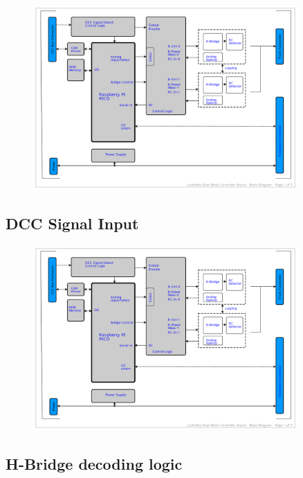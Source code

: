 \begin{figure}[htbp]
    \centering
    \includegraphics[page=2, width=0.9\textwidth]{./Schematics/Schematic_LcsNodes-Dual-Block-Controller.pdf}
\end{figure}
\FloatBarrier


\subsection{DCC Signal Input}

\begin{figure}[htbp]
    \centering
    \includegraphics[page=3, width=0.9\textwidth]{./Schematics/Schematic_LcsNodes-Dual-Block-Controller.pdf}
\end{figure}
\FloatBarrier

\subsection{H-Bridge decoding logic}

